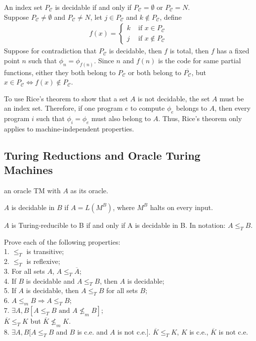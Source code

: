  An index set $P_{\mathscr{C}}$ is decidable if and only if
$P_{\mathscr{C}} = \emptyset$ or $P_{\mathscr{C}}= N$.\\
Suppose $P_{\mathscr{C}} \neq \emptyset$ and $P_{\mathscr{C}} \neq N$, let 
$j \in P_{\mathscr{C}}$ and $k \notin P_{\mathscr{C}}$, define
\begin{align*}
  f(x) = 
  \begin{cases}
    k & \text{ if } x \in P_{\mathscr{C}} \\
    j & \text{ if } x \notin P_{\mathscr{C}}
  \end{cases}
\end{align*}
Suppose for contradiction that $P_{\mathscr{C}}$ is decidable, then $f$ is
total, then $f$ has a fixed point $n$ such that $\phi_n = \phi_{f(n)}$. Since $n$
and $f(n)$ is the code for same partial functions, either they both belong to
$P_{\mathscr{C}}$ or both belong to $\overline{P_{\mathscr{C}}}$, but 
$x \in P_{\mathscr{C}} \Leftrightarrow f(x) \notin P_{\mathscr{C}}$.

To use Rice's theorem to show that a set $A$ is not decidable, the set
$A$ must be an index set. Therefore, if one program $e$ to compute $\phi_e$
belongs to $A$, then every
program $i$ such that $\phi_i = \phi_e$ must also belong to $A$. Thus,
Rice's theorem only applies to machine-independent properties.

\subsection{Turing Reductions and Oracle Turing Machines}

 an oracle TM with $A$ as its oracle.

 $A$ is decidable in $B$ if $A = L(M^B)$, where $M^B$ halts on
every input.

 $A$ is Turing-reducible to B if and only if A is decidable in
B. In notation: $A \le_T B$.

 Prove each of the following properties:\\
1. $\le_T$ is transitive;\\
2. $\le_T$ is reflexive;\\
3. For all sets $A$, $A \le_T \overline{A}$;\\
4. If $B$ is decidable and $A \le_T B$, then $A$ is decidable; \\
5. If $A$ is decidable, then $A \le_T B$ for all sets $B$;\\
6. $A \le_m B \Rightarrow A \le_T B$;\\
7. $\exists A, B[A \le_T B \text{ and } A \nleq_m B]$;\\
$\overline{K} \le_T K$ but $\overline{K} \nleq_m K$.\\
8. $\exists A, B[A \le_T B$ and $B$ is c.e. and $A$ is not c.e.].
$\overline{K} \le_T K$, $K$ is c.e., $\overline{K}$ is not c.e.


